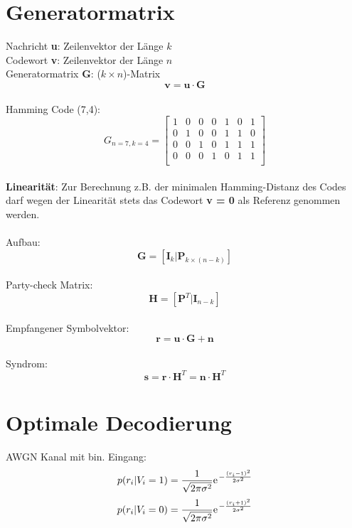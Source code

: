 \section{Generatormatrix}
Nachricht \textbf{u}: Zeilenvektor der Länge $k$\\
Codewort \textbf{v}: Zeilenvektor der Länge $n$\\
Generatormatrix \textbf{G}: ($k\times n$)-Matrix\\
\[ \textbf{v} = \textbf{u} \cdot \textbf{G} \]
~\\
Hamming Code (7,4):
\[ G_{n=7,k=4} = \begin{bmatrix}
	1 & 0 & 0 & 0 & 1 & 0 & 1 \\
	0 & 1 & 0 & 0 & 1 & 1 & 0 \\
	0 & 0 & 1 & 0 & 1 & 1 & 1 \\
	0 & 0 & 0 & 1 & 0 & 1 & 1 \\
\end{bmatrix} \]
~\\
\textbf{Linearität}: Zur Berechnung z.B. der minimalen Hamming-Distanz des Codes darf wegen 
der Linearität stets das Codewort  \textbf{v = 0} als Referenz genommen werden.
\\\\
Aufbau:
\[ \textbf{G} = \left[\textbf{I}_k|\textbf{P}_{k\times (n-k)}\right] \]
~\\
Party-check Matrix:
\[ \textbf{H} = \left[\textbf{P}^T | \textbf{I}_{n-k}\right] \]
~\\
Empfangener Symbolvektor:
\[ \textbf{r} = \textbf{u} \cdot \textbf{G} + \textbf{n} \]
~\\
Syndrom:
\[ \textbf{s} = \textbf{r} \cdot \textbf{H}^T = \textbf{n} \cdot \textbf{H}^T \]

\section{Optimale Decodierung}
AWGN Kanal mit bin. Eingang:
\[ p(r_i|V_i=1) = \frac{1}{\sqrt{2\pi\sigma^2}} \e^{-\frac{(r_i-1)^2}{2\sigma^2}} \]
\[ p(r_i|V_i=0) = \frac{1}{\sqrt{2\pi\sigma^2}} \e^{-\frac{(r_i+1)^2}{2\sigma^2}} \]

